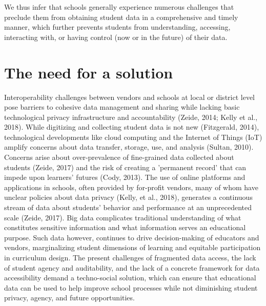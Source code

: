 \documentclass{article}
\begin{document}
We thus infer that schools generally experience numerous challenges that preclude them from obtaining student data in a comprehensive and timely manner, which further prevents students from understanding, accessing, interacting with, or having control (now or in the future) of their data. 

\section{The need for a solution}

Interoperability challenges between vendors and schools at local or district level pose barriers to cohesive data management and sharing while lacking basic technological privacy infrastructure and accountability (Zeide, 2014; Kelly et al., 2018). While digitizing and collecting student data is not new (Fitzgerald, 2014), technological developments like cloud computing and the Internet of Things (IoT) amplify concerns about data transfer, storage, use, and analysis (Sultan, 2010).
\bigbreak
Concerns arise about over-prevalence of fine-grained data collected about students (Zeide, 2017) and the risk of creating a 'permanent record' that can impede upon learners' futures (Cody, 2013). The use of online platforms and applications in schools, often provided by for-profit vendors, many of whom have unclear policies about data privacy (Kelly, et al., 2018), generates a continuous stream of data about students' behavior and performance at an unprecedented scale (Zeide, 2017). Big data complicates traditional understanding of what constitutes sensitive information and what information serves an educational purpose. Such data however, continues to drive decision-making of educators and vendors, marginalizing student dimensions of learning and equitable participation in curriculum design.
\bigbreak
The present challenges of fragmented data access, the lack of student agency and auditability, and the lack of a concrete framework for data accessibility demand a techno-social solution, which can ensure that educational data can be used to help improve school processes while not diminishing student privacy, agency, and future opportunities.
\end{document}
